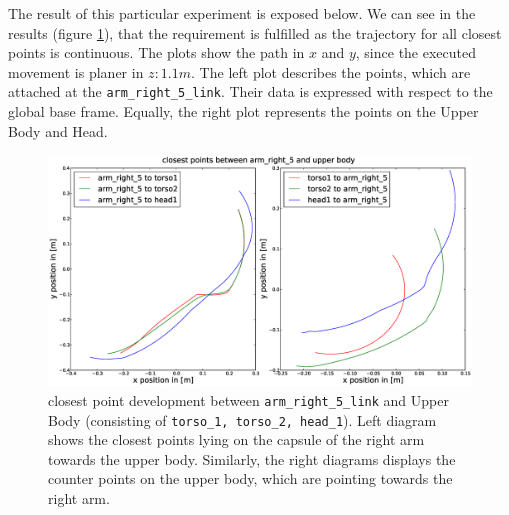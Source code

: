 The result of this particular experiment is exposed below. We can see in the results (figure \ref{fig:cptogether}), that the requirement is fulfilled as the trajectory for all closest points is continuous. The plots show the path in $x$ and $y$, since the executed movement is planer in $z:1.1m$. The left plot describes the points, which are attached at the \verb|arm_right_5_link|. Their data is expressed with respect to the global base frame. Equally, the right plot represents the points on the Upper Body and Head.
\begin{figure}[h!]
  \includegraphics[width=\textwidth]{../figures/closest_points/three_topics_together.eps}
\caption{closest point development between \texttt{arm\_right\_5\_link} and Upper Body (consisting of \texttt{torso\_1, torso\_2, head\_1}). Left diagram shows the closest points lying on the capsule of the right arm towards the upper body. Similarly, the right diagrams displays the counter points on the upper body, which are pointing towards the right arm. } 
    \label{fig:cptogether}
\end{figure}

